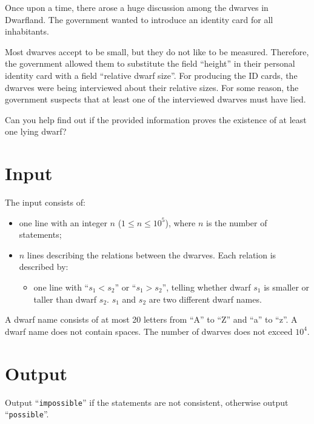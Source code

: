 
Once upon a time, there arose a huge discussion among the dwarves in Dwarfland. The government wanted to introduce an identity card for all inhabitants. 

Most dwarves accept to be small, but they do not like to be measured. Therefore, the government allowed them to substitute the field ``height'' in their personal identity card with a field ``relative dwarf size''. For producing the ID cards, the dwarves were being interviewed about their relative sizes. For some reason, the government suspects that at least one of the interviewed dwarves must have lied. 

Can you help find out if the provided information proves the existence of at least one lying dwarf?

\section*{Input}

The input consists of:
\begin{itemize}
\item one line with an integer $n$ ($1 \le n \le 10^5$), where $n$ is the number of statements;
\item $n$ lines describing the relations between the dwarves. Each relation is described by:
\begin{itemize}
\item one line with ``$s_1 < s_2$'' or ``$s_1 > s_2$'', telling whether dwarf $s_1$ is smaller or taller than dwarf $s_2$. $s_1$ and $s_2$ are two different dwarf names.
\end{itemize}
\end{itemize}

A dwarf name consists of at most 20 letters from ``A'' to ``Z'' and ``a'' to ``z''. A dwarf name does not contain spaces. The number of dwarves does not exceed $10^4$.

\section*{Output}

Output ``{\tt impossible}'' if the statements are not consistent, otherwise output ``{\tt possible}''.
